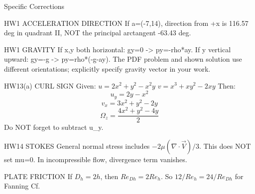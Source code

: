 Specific Corrections

HW1 ACCELERATION DIRECTION
If a=(-7,14), direction from +x is 116.57 deg in quadrant II, NOT the principal arctangent -63.43 deg.

HW1 GRAVITY
If x,y both horizontal: gy=0 -> py=-rho*ay.
If y vertical upward: gy=-g -> py=rho*(-g-ay).
The PDF problem and shown solution use different orientations; explicitly specify gravity vector in your work.

HW13(a) CURL SIGN
Given:
$u=2x^2+y^2-x^2y$
$v=x^3+xy^2-2xy$
Then:
$$u_y=2y-x^2$$
$$v_x=3x^2+y^2-2y$$
$$\Omega_z=\frac{4x^2+y^2-4y}{2}$$
Do NOT forget to subtract u_y.

HW14 STOKES
General normal stress includes $-2\mu(\nabla\cdot\vec V)/3$. This does NOT set mu=0. In incompressible flow, divergence term vanishes.

PLATE FRICTION
If $D_h=2h$, then $Re_{Dh}=2Re_h$. So $12/Re_h=24/Re_{Dh}$ for Fanning Cf.
